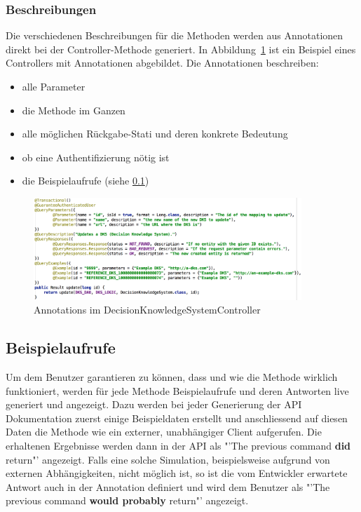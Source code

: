 		\subsubsection{Beschreibungen}
			Die verschiedenen Beschreibungen für die Methoden werden aus Annotationen direkt bei der Controller-Methode generiert.
			In Abbildung\ \ref{fig:apiAnnotations} ist ein Beispiel eines Controllers mit Annotationen abgebildet.
			Die Annotationen beschreiben:
			\begin{itemize}
				\item{alle Parameter}
				\item{die Methode im Ganzen}
				\item{alle möglichen Rückgabe-Stati und deren konkrete Bedeutung}
				\item{ob eine Authentifizierung nötig ist}
				\item{die Beispielaufrufe (siehe \ref{subsubsec:exampleQueries})}
			\end{itemize}
			\begin{figure}[H]
				\includegraphics[width=0.9\textwidth]{codeDocumentation/media/img/apiAnnotations.png}
				\centering
				\caption{Annotations im DecisionKnowledgeSystemController}
				\label{fig:apiAnnotations}
			\end{figure}
			
	\subsection{Beispielaufrufe}
	\label{subsubsec:exampleQueries}
		Um dem Benutzer garantieren zu können, dass und wie die Methode wirklich funktioniert,
		werden für jede Methode Beispielaufrufe und deren Antworten live generiert und angezeigt.
		Dazu werden bei jeder Generierung der API Dokumentation zuerst einige Beispieldaten erstellt
		und anschliessend auf diesen Daten die Methode wie ein externer, unabhängiger Client aufgerufen.
		Die erhaltenen Ergebnisse werden dann in der API als "'The previous command \textbf{did} return"' angezeigt.
		Falls eine solche Simulation, beispielsweise aufgrund von externen Abhängigkeiten, nicht möglich ist,
		so ist die vom Entwickler erwartete Antwort auch in der Annotation definiert und wird dem Benutzer als
		"'The previous command \textbf{would probably} return"' angezeigt.
		

